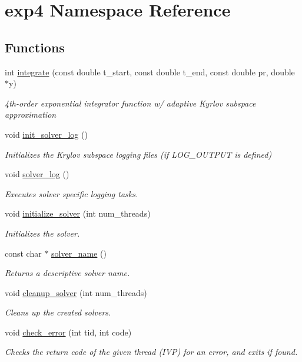 \hypertarget{namespaceexp4}{}\section{exp4 Namespace Reference}
\label{namespaceexp4}
\subsection*{Functions}
\begin{DoxyCompactItemize}
\item 
int \hyperlink{namespaceexp4_a8d03ab917f8736a37474362beeff9391}{integrate} (const double t\+\_\+start, const double t\+\_\+end, const double pr, double $\ast$y)
\begin{DoxyCompactList}\small\item\em 4th-\/order exponential integrator function w/ adaptive Kyrlov subspace approximation \end{DoxyCompactList}\item 
void \hyperlink{namespaceexp4_a1ef7b39a9ac7da4247fd05807f000b07}{init\+\_\+solver\+\_\+log} ()
\begin{DoxyCompactList}\small\item\em Initializes the Krylov subspace logging files (if L\+O\+G\+\_\+\+O\+U\+T\+P\+UT is defined) \end{DoxyCompactList}\item 
void \hyperlink{namespaceexp4_adc563232bff1c62e2068039175a6f428}{solver\+\_\+log} ()
\begin{DoxyCompactList}\small\item\em Executes solver specific logging tasks. \end{DoxyCompactList}\item 
void \hyperlink{namespaceexp4_ab5d3c8262078fd94e511c54eb766f46c}{initialize\+\_\+solver} (int num\+\_\+threads)
\begin{DoxyCompactList}\small\item\em Initializes the solver. \end{DoxyCompactList}\item 
const char $\ast$ \hyperlink{namespaceexp4_aecc47dad1f4379532ab54b896a5e3771}{solver\+\_\+name} ()
\begin{DoxyCompactList}\small\item\em Returns a descriptive solver name. \end{DoxyCompactList}\item 
void \hyperlink{namespaceexp4_a0a595493de14a8f82826268b344339a8}{cleanup\+\_\+solver} (int num\+\_\+threads)
\begin{DoxyCompactList}\small\item\em Cleans up the created solvers. \end{DoxyCompactList}\item 
void \hyperlink{namespaceexp4_a40f949e51fd1c796b23f6d81612720fb}{check\+\_\+error} (int tid, int code)
\begin{DoxyCompactList}\small\item\em Checks the return code of the given thread (I\+VP) for an error, and exits if found. \end{DoxyCompactList}\end{DoxyCompactItemize}


